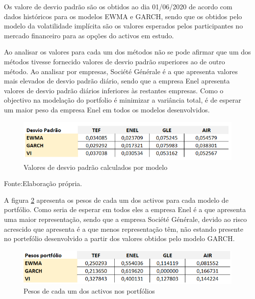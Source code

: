 \documentclass[
  12pt,
  a4paper,
  openany]{book}
\theoremstyle{definition}
\theoremstyle{definition}
\theoremstyle{definition}
\theoremstyle{remark}
\begin{document}
Os valore de desvio padrão são os obtidos ao dia 01/06/2020 de acordo com dados históricos para os modelos EWMA e GARCH, sendo que os obtidos pelo modelo da volatilidade implícita são os valores esperados pelos participantes no mercado financeiro para as opções do activos em estudo.

Ao analisar os valores para cada um dos métodos não se pode afirmar que um dos métodos tivesse fornecido valores de desvio padrão superiores ao de outro método. Ao analisar por empresas, Société Générale é a que apresenta valores mais elevados de desvio padrão diário, sendo que a empresa Enel apresenta valores de desvio padrão diários inferiores às restantes empresas. Como o objectivo na modelação do portfolio é minimizar a variância total, é de esperar um maior peso da empresa Enel em todos os modelos desenvolvidos.

\begin{figure}

{\centering \includegraphics[width=0.8\linewidth]{image/desvio} 

}

\caption{Valores de desvio padrão calculados por modelo}\label{fig:umdesvio}
\end{figure}
\FloatBarrier
\centering

Fonte:Elaboração própria.

\justifying
\bigskip

A figura \ref{fig:umpeso} apresenta os pesos de cada um dos activos para cada modelo de portfólio. Como seria de esperar em todos eles a empresa Enel é a que apresenta uma maior representação, sendo que a empresa Société Générale, devido ao risco acrescido que apresenta é a que menos representação têm, não estando presente no portefólio desenvolvido a partir dos valores obtidos pelo modelo GARCH.

\begin{figure}

{\centering \includegraphics[width=0.8\linewidth]{image/pesos} 

}

\caption{Pesos de cada um dos activos nos portfólios}\label{fig:umpeso}
\end{figure}
\FloatBarrier
\centering
\end{document}
